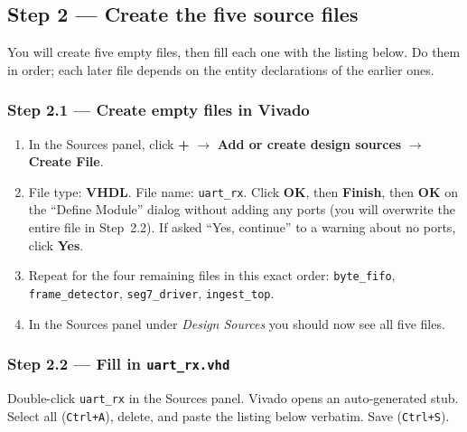 \documentclass[11pt,letterpaper]{article}
\begin{document}
\newpage
\subsection{Step 2 --- Create the five \VHDL{} source files}

You will create five empty \VHDL{} files, then fill each one with the listing below. Do them in order; each later file depends on the entity declarations of the earlier ones.

\subsubsection*{Step 2.1 --- Create empty \VHDL{} files in Vivado}

\begin{enumerate}[leftmargin=2em]
	\item In the Sources panel, click \textbf{+} $\to$ \textbf{Add or create design sources} $\to$ \textbf{Create File}.
	\item File type: \textbf{VHDL}. File name: \texttt{uart\_rx}. Click \textbf{OK}, then \textbf{Finish}, then \textbf{OK} on the ``Define Module'' dialog without adding any ports (you will overwrite the entire file in Step~2.2). If asked ``Yes, continue'' to a warning about no ports, click \textbf{Yes}.
	\item Repeat for the four remaining files in this exact order: \texttt{byte\_fifo}, \texttt{frame\_detector}, \texttt{seg7\_driver}, \texttt{ingest\_top}.
	\item In the Sources panel under \textit{Design Sources} you should now see all five files.
\end{enumerate}

\newpage
\subsubsection*{Step 2.2 --- Fill in \texttt{uart\_rx.vhd}}

Double-click \texttt{uart\_rx} in the Sources panel. Vivado opens an auto-generated stub. Select all (\texttt{Ctrl+A}), delete, and paste the listing below verbatim. Save (\texttt{Ctrl+S}).
\end{document}
